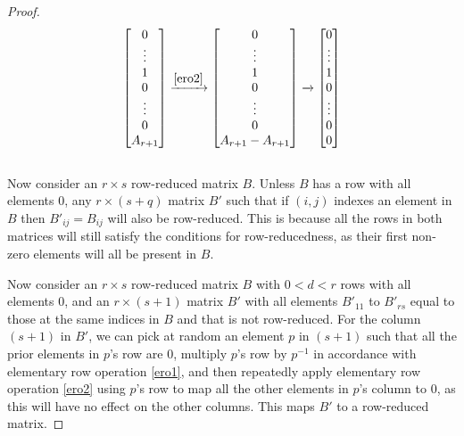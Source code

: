 \documentclass[12pt]{article}
\begin{document}
\begin{thm}
\begin{proof}
    \begin{align*}
      \begin{bmatrix}
        0\\
        \vdots\\
        1\\
        0\\
        \vdots\\
        0\\
        A_{r + 1}
      \end{bmatrix}
      \xrightarrow{\eqref{ero2}}
      \begin{bmatrix}
        0\\
        \vdots\\
        1\\
        0\\
        \vdots\\
        0\\
        A_{r + 1} - A_{r + 1}
      \end{bmatrix}
      \xrightarrow{}
      \begin{bmatrix}
        0\\
        \vdots\\
        1\\
        0\\
        \vdots\\
        0\\
        0\\
      \end{bmatrix}
    \end{align*}\\

    Now consider an $r \times s$ row-reduced matrix $B$. Unless
    $B$ has a row with all elements $0$, any $r \times (s + q)$
    matrix $B'$ such that if $(i,j)$ indexes an element in $B$
    then $B'_{ij} = B_{ij}$ will also be row-reduced. This is
    because all the rows in both matrices will still satisfy the
    conditions for row-reducedness, as their first non-zero
    elements will all be present in $B$.

    Now consider an $r \times s$ row-reduced matrix $B$ with $0 <
    d < r$ rows with all elements $0$, and an $r \times (s + 1)$
    matrix $B'$ with all elements $B'_{11}$ to $B'_{rs}$ equal to
    those at the same indices in $B$ and that is not row-reduced.
    For the column $(s + 1)$ in $B'$, we can pick at random an
    element $p$ in $(s + 1)$ such that all the prior elements in
    $p$'s row are $0$, multiply $p$'s row by $p^{-1}$ in
    accordance with elementary row operation \eqref{ero1}, and
    then repeatedly apply elementary row operation \eqref{ero2}
    using $p$'s row to map all the other elements in $p$'s column
    to $0$, as this will have no effect on the other columns.
    This maps $B'$ to a row-reduced matrix.


\end{proof}
\end{thm}
\end{document}
